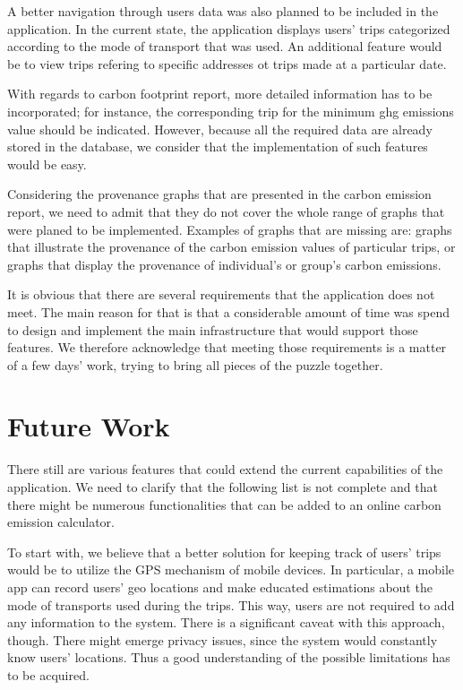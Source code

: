 A  better navigation through users data was also planned to be included in the application. In the current state, the application displays users' trips categorized according to the mode of transport that was used. An additional feature would be to view trips refering to specific addresses ot trips made at a particular date.

With regards to carbon footprint report, more detailed information has to be incorporated; for instance, the corresponding trip for the minimum ghg emissions value should be indicated. However, because all the required data are already stored in the database, we consider that the implementation of such features would be easy.

Considering the provenance graphs that are presented in the carbon emission report, we need to admit that they do not cover the whole range of graphs that were planed to be implemented. Examples of graphs that are missing are: graphs that illustrate the provenance of the carbon emission values of particular trips, or graphs that display the provenance of individual's or group's carbon emissions.

It is obvious that there are several requirements that the application does not meet. The main reason for that is that a considerable amount of time was spend to design and implement the main infrastructure that would support those features. We therefore acknowledge that meeting those requirements is a matter of a few days' work, trying to bring all pieces of the puzzle together.

\section{Future Work}

There still are various features that could extend the current capabilities of the application. We need to clarify that the following list is not complete and that there might be numerous functionalities that can be added to an online carbon emission calculator.

To start with, we believe that a better solution for keeping track of users' trips would be to utilize the GPS mechanism of mobile devices.  In particular, a mobile app can record users' geo locations and make educated estimations about the mode of transports used during the trips. This way, users are not required to add any information to the system. There is a significant caveat with this approach, though.  There might emerge privacy issues, since the system would constantly know users' locations. Thus a good understanding of the possible limitations has to be acquired.

